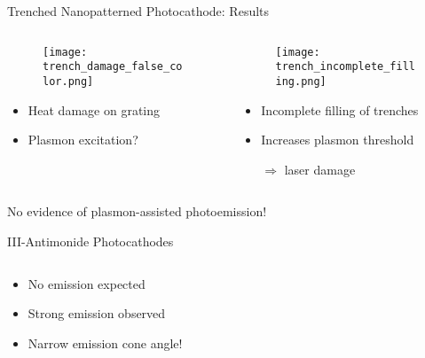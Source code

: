 \begin{frame}{Trenched Nanopatterned Photocathode: Results}
  \begin{columns}
    \begin{column}{0.49\linewidth}
      \begin{figure}
        \centering
        \texttt{[image: trench\_damage\_false\_color.png]}
      \end{figure}
      \begin{itemize}
        \item Heat damage on grating
        \item Plasmon excitation?
      \end{itemize}
    \end{column}
    \begin{column}{0.49\linewidth}
      \begin{figure}
        \centering
        \texttt{[image: trench\_incomplete\_filling.png]}
      \end{figure}
      \begin{itemize}
        \item Incomplete filling of trenches
        \item Increases plasmon threshold 
        \item[$\Rightarrow$] laser damage 
      \end{itemize}
    \end{column}
  \end{columns}
  \vfill
  \begin{center}
    \alert{No evidence of plasmon-assisted photoemission!}
  \end{center}
\end{frame}

\begin{frame}{III-Antimonide Photocathodes}
  \begin{columns}
    \begin{column}{0.30\linewidth}
      \begin{itemize}
        \item No emission expected
        \item<2-> Strong emission observed
        \item<3-> Narrow emission cone angle!
      \end{itemize}
    \end{column}
    \begin{column}{0.68\linewidth}
  \begin{figure}
    \centering
  \end{figure}
    \end{column}
  \end{columns}
\end{frame}


